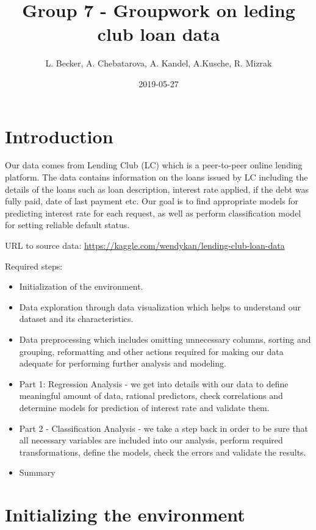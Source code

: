\documentclass[]{article}
\title{Group 7 - Groupwork on leding club loan data}
\author{L. Becker, A. Chebatarova, A. Kandel, A.Kusche, R. Mizrak}
\date{2019-05-27}
\begin{document}
\maketitle

\hypertarget{introduction}{%
\section{Introduction}\label{introduction}}

Our data comes from Lending Club (LC) which is a peer-to-peer online
lending platform. The data contains information on the loans issued by
LC including the details of the loans such as loan description, interest
rate applied, if the debt was fully paid, date of last payment etc. Our
goal is to find appropriate models for predicting interest rate for each
request, as well as perform classification model for setting reliable
default status.

URL to source data:
\url{https://kaggle.com/wendykan/lending-club-loan-data}

Required steps:

\begin{itemize}
\item
  Initialization of the environment.
\item
  Data exploration through data visualization which helps to understand
  our dataset and its characteristics.
\item
  Data preprocessing which includes omitting unnecessary columns,
  sorting and grouping, reformatting and other actions required for
  making our data adequate for performing further analysis and modeling.
\item
  Part 1: Regression Analysis - we get into details with our data to
  define meaningful amount of data, rational predictors, check
  correlations and determine models for prediction of interest rate and
  validate them.
\item
  Part 2 - Classification Analysis - we take a step back in order to be
  sure that all necessary variables are included into our analysis,
  perform required transformations, define the models, check the errors
  and validate the results.
\item
  Summary
\end{itemize}

\hypertarget{initializing-the-environment}{%
\section{Initializing the
environment}\label{initializing-the-environment}}
\end{document}
